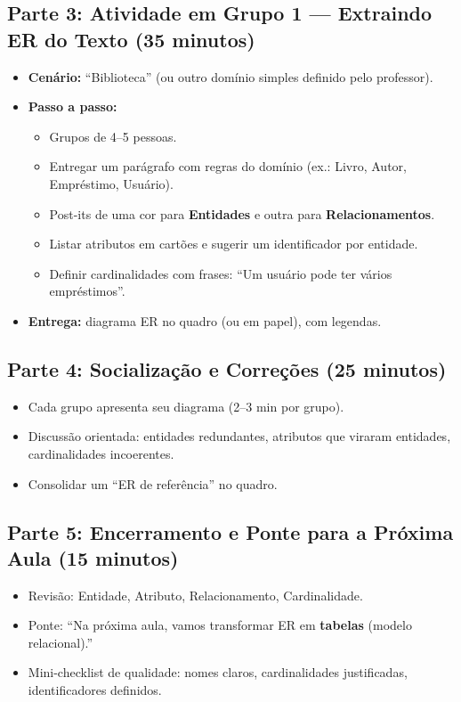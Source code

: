 \documentclass[12pt,a4paper]{article}
\begin{document}
\subsection*{Parte 3: Atividade em Grupo 1 --- Extraindo ER do Texto (35 minutos)}
\begin{itemize}[leftmargin=*,itemsep=0.35em]
  \item \textbf{Cenário:} ``Biblioteca'' (ou outro domínio simples definido pelo professor).
  \item \textbf{Passo a passo:}
  \begin{itemize}[leftmargin=*,itemsep=0.25em]
    \item Grupos de 4--5 pessoas.
    \item Entregar um parágrafo com regras do domínio (ex.: Livro, Autor, Empréstimo, Usuário).
    \item Post-its de uma cor para \textbf{Entidades} e outra para \textbf{Relacionamentos}.
    \item Listar atributos em cartões e sugerir um identificador por entidade.
    \item Definir cardinalidades com frases: ``Um usuário pode ter vários empréstimos''.
  \end{itemize}
  \item \textbf{Entrega:} diagrama ER no quadro (ou em papel), com legendas.
\end{itemize}

\subsection*{Parte 4: Socialização e Correções (25 minutos)}
\begin{itemize}[leftmargin=*,itemsep=0.35em]
  \item Cada grupo apresenta seu diagrama (2--3 min por grupo).
  \item Discussão orientada: entidades redundantes, atributos que viraram entidades, cardinalidades incoerentes.
  \item Consolidar um ``ER de referência'' no quadro.
\end{itemize}

\subsection*{Parte 5: Encerramento e Ponte para a Próxima Aula (15 minutos)}
\begin{itemize}[leftmargin=*,itemsep=0.35em]
  \item Revisão: Entidade, Atributo, Relacionamento, Cardinalidade.
  \item Ponte: ``Na próxima aula, vamos transformar ER em \textbf{tabelas} (modelo relacional).''
  \item Mini-checklist de qualidade: nomes claros, cardinalidades justificadas, identificadores definidos.
\end{itemize}
\end{document}
